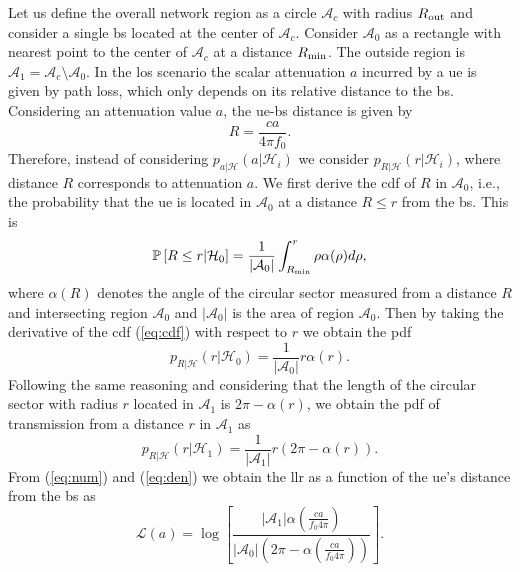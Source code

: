 \documentclass[conference,final]{IEEEtran}
\newcommand{\pr}[1]{\mathbb{P} \left[ #1 \right]}
\begin{document}
Let us define the overall network region as a circle $\mathcal{A}_c$ with radius $R_{\rm out}$ and consider a single \ac{bs} located at the center of $\mathcal{A}_c$. Consider $\mathcal{A}_{0}$ as a rectangle with nearest point to the center of $\mathcal{A}_c$ at a distance $R_{\rm min}$. The outside region is $\mathcal{A}_1 = \mathcal{A}_c \setminus \mathcal{A}_0$. In the \ac{los} scenario the scalar attenuation $a$ incurred by a \ac{ue} is given by path loss, which only depends on its relative distance to the \ac{bs}. Considering an attenuation value $a$, the \ac{ue}-\ac{bs} distance  is given by
\begin{equation}
    R = \frac{c a}{ 4 \pi f_0}.
\end{equation}
Therefore, instead of considering $p_{a|\mathcal{H}}(a|\mathcal H_i)$ we consider $p_{R|\mathcal{H}}(r|\mathcal H_i)$, where distance $R$ corresponds to attenuation $a$. We first derive the \ac{cdf} of $R$ in $\mathcal{A}_0$, i.e.,  the probability that the \ac{ue} is located in $\mathcal{A}_0$ at a distance $R\le r$ from the \ac{bs}. This is
\begin{equation}\label{eq:cdf}
     \pr{R \le r|\mathcal{H}_0} = \frac{1}{|\mathcal{A}_0|}\int_{R_{\rm min}}^{r} \rho \alpha(\rho) d\rho,     
\end{equation}
where $\alpha(R)$ denotes the angle of the circular sector measured from a distance $R$ and intersecting region $\mathcal{A}_0$ and $|\mathcal{A}_0|$ is the area of region $\mathcal{A}_0$. Then by taking the derivative of the \ac{cdf} (\ref{eq:cdf}) with respect to $r$ we obtain the \ac{pdf} 
\begin{equation}\label{eq:num}
    p_{R|\mathcal{H}}(r|\mathcal{H}_0) = \frac{1}{|\mathcal{A}_0|}r\alpha(r).
\end{equation}
Following the same reasoning and considering that the length of the circular sector with radius $r$ located in $\mathcal{A}_1$ is $2\pi - \alpha(r)$, we obtain the \ac{pdf} of transmission from a distance $r$ in $\mathcal{A}_1$ as
\begin{equation}\label{eq:den}
     p_{R|\mathcal{H}}(r|\mathcal{H}_1) = \frac{1}{|\mathcal{A}_1|}r\left(2\pi-\alpha(r)\right).
\end{equation}
From (\ref{eq:num}) and (\ref{eq:den}) we obtain the \ac{llr} as a function of the \ac{ue}'s distance from the \ac{bs} as 
\begin{equation}
    \mathcal{L}{(a)}=\log\left[\frac{|\mathcal{A}_1|\alpha \left(\frac{c a}{f_0 4 \pi}\right)}{|\mathcal{A}_0|\left(2\pi-\alpha\left(\frac{c a}{f_0 4 \pi}\right)\right)}\right].
\end{equation}
\end{document}
